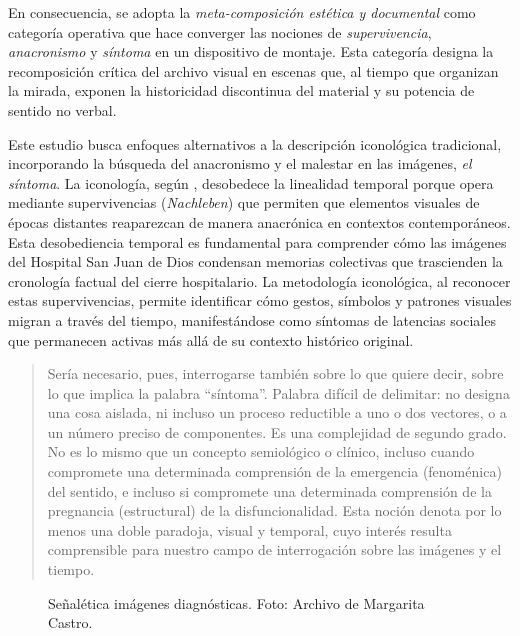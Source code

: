 \textcolor{edit30sept}{En consecuencia, se adopta la \textit{meta-composición estética y documental} como categoría operativa que hace converger las nociones de \textit{supervivencia}, \textit{anacronismo} y \textit{síntoma} en un dispositivo de montaje. Esta categoría designa la recomposición crítica del archivo visual en escenas que, al tiempo que organizan la mirada, exponen la historicidad discontinua del material y su potencia de sentido no verbal.}

\textcolor{edit30sept}{Este estudio busca enfoques alternativos a la descripción iconológica tradicional, incorporando la búsqueda del anacronismo y el malestar en las imágenes, \textit{el síntoma}. La iconología, según \parencite{Warburg2010}, desobedece la linealidad temporal porque opera mediante supervivencias (\textit{Nachleben}) que permiten que elementos visuales de épocas distantes reaparezcan de manera anacrónica en contextos contemporáneos. Esta desobediencia temporal es fundamental para comprender cómo las imágenes del Hospital San Juan de Dios condensan memorias colectivas que trascienden la cronología factual del cierre hospitalario. La metodología iconológica, al reconocer estas supervivencias, permite identificar cómo gestos, símbolos y patrones visuales migran a través del tiempo, manifestándose como síntomas de latencias sociales que permanecen activas más allá de su contexto histórico original.}

\begin{quote}
    Sería necesario, pues, interrogarse también sobre lo que quiere decir, sobre lo que implica la palabra “síntoma”. Palabra difícil de delimitar: no designa una cosa aislada, ni incluso un proceso reductible a uno o dos vectores, o a un número preciso de componentes. Es una complejidad de segundo grado. No es lo mismo que un concepto semiológico o clínico, incluso cuando compromete una determinada comprensión de la emergencia (fenoménica) del sentido, e incluso si compromete una determinada comprensión de la pregnancia (estructural) de la disfuncionalidad. Esta noción denota por lo menos una doble paradoja, visual y temporal, cuyo interés resulta comprensible para nuestro campo de interrogación sobre las imágenes y el tiempo. \parencite[p. 63]{DidiHuberman2011}
\end{quote}

\begin{figure}[p]
\thispagestyle{empty}
\captionsetup{labelformat=empty,textformat=empty}
\caption{Señalética imágenes diagnósticas. Foto: Archivo de Margarita Castro.}
\label{fig:senaletica_imagenes_diagnosticas}
\end{figure}

